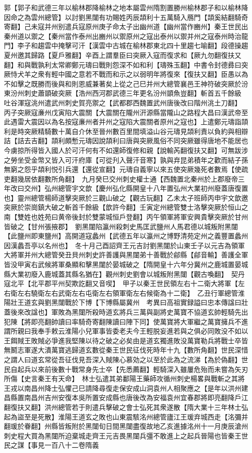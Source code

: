 郭【郭子和武德三年以榆林郡降榆林之地本屬雲州隋割置勝州榆林郡子和以榆林降因命之為雲州總管】以討劉黑闥有功賜姓丙辰頡利十五萬騎入鴈門【頡奚結翻騎奇寄翻】己未寇并州别遣兵寇原州庚子命太子出幽州道【幽州當作豳州】秦王世民出秦州道以禦之【秦州當作泰州出豳州以禦原州之寇出泰州以禦并州之寇泰州時治龍門】李子和趨雲中掩擊可汗【漢雲中古城在榆林郡東北四十里趨七喻翻】段德操趨夏州邀其歸路【夏戶雅翻】辛酉上謂羣臣曰突厥入寇而復求和【厥九勿翻復扶又翻】和與戰孰利太常卿鄭元璹曰戰則怨深不如和利【璹殊玉翻】中書令封德彞曰突厥恃犬羊之衆有輕中國之意若不戰而和示之以弱明年將復來【復扶又翻】臣愚以為不如擊之既勝而後與和則恩威兼著矣上從之己巳并州大總管襄邑王神符破突厥於汾東汾州刺史蕭顗破突厥【浩州西河郡武德三年更名汾州顗魚豈翻】斬首五千餘級　吐谷渾寇洮州遣武州刺史賀亮禦之【武都郡西魏置武州唐後改曰階州洮土刀翻】　丙子突厥寇亷州戊寅陷大震關【大震關在隴州汧源縣當隴山之路程大昌曰漢武帝至此遇雷大震因以為名按寇亷州者并州之寇陷大震關者原州之寇也】上遣鄭元璹詣頡利是時突厥精騎數十萬自介休至晉州數百里間填溢山谷元璹見頡利責以負約與相辯詰【詰去吉翻】頡利頗慙元璹因說頡利曰唐與突厥風俗不同突厥雖得唐地不能居也今虜掠所得皆入國人於可汗何有不如還師復修和親【說輸芮翻復扶又翻】可無跋涉之勞坐受金幣又皆入可汗府庫【可從刋入聲汗音寒】孰與弃昆弟積年之歡而結子孫無窮之怨乎頡利悦引兵還【還從宣翻】元璹自義寧以來五使突厥幾死者數焉【使疏吏翻幾居依翻數所角翻】　九月癸巳交州刺史權士通【西魏置北秦州於上郡廢帝三年改曰交州】弘州總管宇文歆【慶州弘化縣開皇十八年置弘州大業初州廢蓋唐復置也】靈州總管楊師道擊突厥於三觀山破之【觀古玩翻】乙未太子班師丙申宇文歆邀突厥於崇崗鎮大破之斬首千餘級【歆許今翻】壬寅定州總管雙士洛擊突厥於恒山之南【雙姓也姓苑曰黄帝後封於雙蒙城恒戶登翻】丙午領軍將軍安興貴擊突厥於甘州皆破之【甘州張掖郡】　劉黑闥陷瀛州殺刺史馬匡武鹽州人馬君德以城叛附黑闥【此鹽州即東鹽州】高開道寇蠡州【武德五年以瀛州之博野清苑定州之義豐置蠡州因漢蠡吾亭以名州也】　冬十月己酉詔齊王元吉討劉黑闥於山東壬子以元吉為領軍大將軍并州大總管癸丑貝州刺史許善護與黑闥弟十善戰於鄃縣【鄃音輸】善護全軍皆没甲寅右武候將軍桑顯和擊黑闥於晏城破之【隋開皇十六年分冀州之鹿城置晏城縣大業初廢入鹿城蓋其縣名猶在】觀州刺史劉會以城叛附黑闥【觀古喚翻】　契丹寇北平【北平郡平州契欺訖翻又音喫】　甲子以秦王世民領左右十二衛大將軍【左右衛左右驍衛左右武衛左右屯衛左右領軍衛左右候衛為十二衛】　乙丑行軍總管淮陽壯王道玄與劉黑闥戰於下博【下博縣屬冀州　考異曰高祖實録謚曰忠本傳諡曰壯蓋後來改諡也】軍敗為黑闥所殺時道玄將兵三萬與副將史萬寶不協道玄帥輕騎先出犯陳【將即亮翻帥讀曰率騎奇寄翻陳讀曰陣下同】使萬寶將大軍繼之萬寶擁兵不進謂所親曰我奉手敕云淮陽小兒軍事皆委老夫今王輕脱妄進若與之俱必同敗没不如以王餌賊王敗賊必爭進我堅陳以待之破之必矣由是道玄獨進敗没萬寶勒兵將戰士卒皆無鬭志軍遂大潰萬寶逃歸道玄數從秦王世民征伐死時年十九【數所角翻】世民深惜之謂人曰道玄常從吾征伐見吾深入賊陳心慕効之以至於此為之流涕【為於偽翻】世民自起兵以來前後數十戰常身先士卒【先悉薦翻】輕騎深入雖屢危殆而未嘗為矢刃所傷【史言秦王有天命】　林士弘遣其弟鄱陽王藥師攻循州刺史楊畧與戰斬之其將王戎以南昌州降士弘懼己巳請降尋復走保安成山洞袁州人相聚應之【是年以洪州建昌縣置南昌州吉州安復本吳所置安成縣也唐後改為安福袁州宜春郡將即亮翻降戶江翻復扶又翻】洪州總管若于則遣兵擊破之會士弘死其衆遂散【隋大業十三年林士弘起為盜至是死散】淮陽王道玄之敗也山東震駭洺州總管廬江王瑗弃城西走【洺彌并翻瑗於眷翻】州縣皆叛附於黑闥旬日間黑闥盡復故地乙亥進據洺州十一月庚辰滄州刺史程大買為黑闥所迫棄城走齊王元吉畏黑闥兵彊不敢進上之起兵晉陽也皆秦王世民之謀【事見一百八十二卷隋義